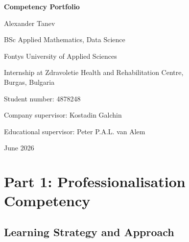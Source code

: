 \documentclass[11pt,a4paper]{report}
\begin{document}
\hypersetup{pageanchor=false}
\begin{titlepage}
  \centering
  \vspace*{2cm}
  {\LARGE\bfseries Competency Portfolio\par}
  \vspace{2cm}
  {\large Alexander Tanev\par}
  \vspace{0.5cm}
  {\normalsize BSc Applied Mathematics, Data Science\par}
  {\normalsize Fontys University of Applied Sciences\par}
  \vspace{1cm}
  {\normalsize Internship at Zdravoletie Health and Rehabilitation Centre,\\
  Burgas, Bulgaria\par}
  \vspace{1cm}
  {\normalsize Student number: 4878248\par}
  {\normalsize Company supervisor: Kostadin Galchin\par}
  {\normalsize Educational supervisor: Peter P.A.L. van Alem\par}
  \vspace{2cm}
  {\normalsize June 2026\par}
  \vfill
\end{titlepage}
\hypersetup{pageanchor=true}

\tableofcontents
\newpage

\chapter{Part 1: Professionalisation Competency}

\section{Learning Strategy and Approach}
\end{document}
